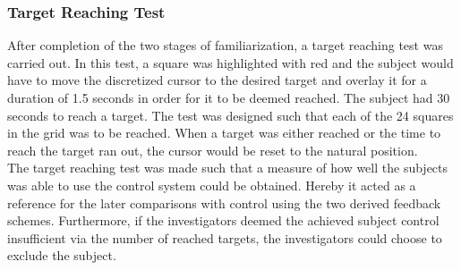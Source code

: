 \subsubsection{Target Reaching Test}

After completion of the two stages of familiarization, a target reaching test was carried out. In this test, a square was highlighted with red and the subject would have to move the discretized cursor to the desired target and overlay it for a duration of 1.5 seconds in order for it to be deemed reached. The subject had 30 seconds to reach a target. The test was designed such that each of the 24 squares in the grid was to be reached. When a target was either reached or the time to reach the target ran out, the cursor would be reset to the natural position. \\
The target reaching test was made such that a measure of how well the subjects was able to use the control system could be obtained. Hereby it acted as a reference for the later comparisons with control using the two derived feedback schemes. Furthermore, if the investigators deemed the achieved subject control insufficient via the number of reached targets, the investigators could choose to exclude the subject.       













